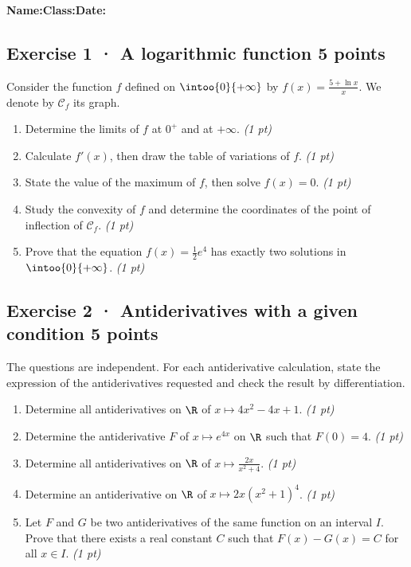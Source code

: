\smallskip\textbf{Name:}\enspace\dotfill\quad\textbf{Class:}\enspace\dotfill\quad\textbf{Date:}\enspace\dotfill

\subsection*{Exercise 1 · A logarithmic function \hfill 5 points}Consider the function $f$ defined on $\intoo{0}{+\infty}$ by $f(x)=\frac{5+\ln x}x$. We denote by $\mathcal C_f$ its graph.

\begin{enumerate}

\item Determine the limits of $f$ at $0^+$ and at $+\infty$. \hfill\textit{(1 pt)}

\item Calculate $f' (x)$, then draw the table of variations of $f$. \hfill\textit{(1 pt)}

\item State the value of the maximum of $f$, then solve $f(x)=0$. \hfill\textit{(1 pt)}

\item Study the convexity of $f$ and determine the coordinates of the point of inflection of $\mathcal C_f$. \hfill\textit{(1 pt)}

\item Prove that the equation $f(x)=\frac12 e^{4}$ has exactly two solutions in $\intoo{0}{+\infty}$. \hfill\textit{(1 pt)}

\end{enumerate}

\subsection*{Exercise 2 · Antiderivatives with a given condition \hfill 5 points}The  questions are independent. For each antiderivative calculation, state the expression of the antiderivatives requested and check the result by differentiation.

\begin{enumerate}

\item Determine all antiderivatives on $\R$ of $x\mapsto 4x^2-4x+1$. \hfill\textit{(1 pt)}

\item Determine the antiderivative $F$ of $x\mapsto e^{4x}$ on $\R$ such that $F(0)=4$. \hfill\textit{(1 pt)}

\item Determine all antiderivatives on $\R$ of $x\mapsto\frac{2x}{x^2+4}$. \hfill\textit{(1 pt)}

\item Determine an antiderivative on $\R$ of $x\mapsto2x(x^2+1)^{4}$. \hfill\textit{(1 pt)}

\item Let $F$ and $G$ be two antiderivatives of the same function on an interval $I$. Prove that there exists a real constant $C$ such that $F(x)-G(x)=C$ for all $x\in I$. \hfill\textit{(1 pt)}

\end{enumerate}

